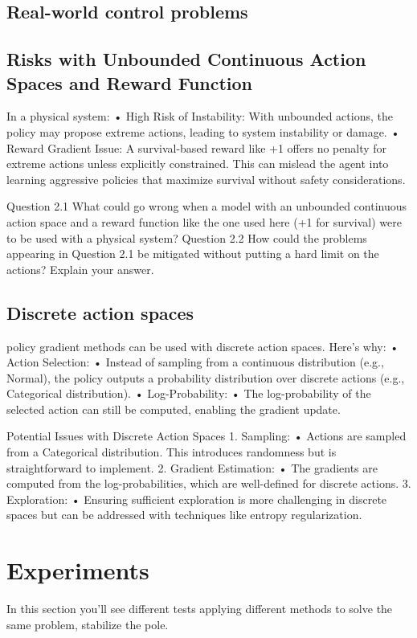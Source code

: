 \documentclass{article}
\begin{document}
\subsection{Real-world control problems}

\subsection{Risks with Unbounded Continuous Action Spaces and Reward Function}
In a physical system:
•	High Risk of Instability: With unbounded actions, the policy may propose extreme actions, leading to system instability or damage.
•	Reward Gradient Issue: A survival-based reward like +1 offers no penalty for extreme actions unless explicitly constrained. This can mislead the agent into learning aggressive policies that maximize survival without safety considerations.

Question 2.1 What could go wrong when a model with an unbounded continuous action space and a
reward function like the one used here (+1 for survival) were to be used with a physical system?
Question 2.2 How could the problems appearing in Question 2.1 be mitigated without putting a hard limit
on the actions? Explain your answer.

\subsection{Discrete action spaces}
policy gradient methods can be used with discrete action spaces. Here’s why:
•	Action Selection:
•	Instead of sampling from a continuous distribution (e.g., Normal), the policy outputs a probability distribution over discrete actions (e.g., Categorical distribution).
•	Log-Probability:
•	The log-probability of the selected action can still be computed, enabling the gradient update.


Potential Issues with Discrete Action Spaces
1.	Sampling:
•	Actions are sampled from a Categorical distribution. This introduces randomness but is straightforward to implement.
2.	Gradient Estimation:
•	The gradients are computed from the log-probabilities, which are well-defined for discrete actions.
3.	Exploration:
•	Ensuring sufficient exploration is more challenging in discrete spaces but can be addressed with techniques like entropy regularization.



\section{Experiments}
In this section you'll see different tests applying different methods to solve the same problem, stabilize the pole. 
\end{document}
